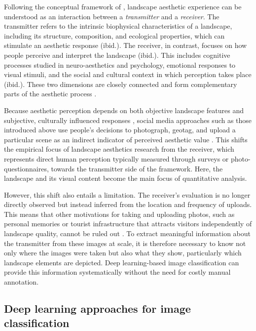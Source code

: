 \documentclass[11pt]{article}
\renewcommand{\_}{\textunderscore\allowbreak{}}
\begin{document}
Following the conceptual framework of \citep{tribot_integrating_2018}, landscape aesthetic experience can be understood as an interaction between a \textit{transmitter} and a \textit{receiver}. The transmitter refers to the intrinsic biophysical characteristics of a landscape, including its structure, composition, and ecological properties, which can stimulate an aesthetic response (ibid.). The receiver, in contrast, focuses on how people perceive and interpret the landscape (ibid.). This includes cognitive processes studied in neuro-aesthetics and psychology, emotional responses to visual stimuli, and the social and cultural context in which perception takes place (ibid.). These two dimensions are closely connected and form complementary parts of the aesthetic process \citep{gobster_shared_2007,tribot_integrating_2018}.

Because aesthetic perception depends on both objective landscape features and subjective, culturally influenced responses \citep{daniel_whither_2001,zhang_assessment_2022}, social media approaches such as those introduced above \citep{tieskens_aesthetic_2018} use people's decisions to photograph, geotag, and upload a particular scene as an indirect indicator of perceived aesthetic value \citep{langemeyer_mapping_2018}. This shifts the empirical focus of landscape aesthetics research from the receiver, which represents direct human perception typically measured through surveys or photo-questionnaires, towards the transmitter side of the framework. Here, the landscape and its visual content become the main focus of quantitative analysis.

However, this shift also entails a limitation. The receiver's evaluation is no longer directly observed but instead inferred from the location and frequency of uploads. This means that other motivations for taking and uploading photos, such as personal memories or tourist infrastructure that attracts visitors independently of landscape quality, cannot be ruled out \citep{tieskens_aesthetic_2018}. To extract meaningful information about the transmitter from these images at scale, it is therefore necessary to know not only where the images were taken but also what they show, particularly which landscape elements are depicted. Deep learning-based image classification can provide this information systematically without the need for costly manual annotation.

\subsection{Deep learning approaches for image classification}
\end{document}

